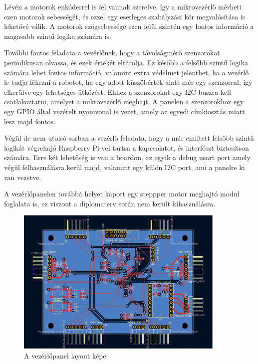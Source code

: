 Lévén a motorok enkóderrel is fel vannak szerelve, így a mikrovezérlő mérheti
ezen motorok sebességét, és ezzel egy esetleges szabályzási kör megvalósítása is
lehetővé válik. A motorok szögsebessége ezen felül szintén egy fontos információ
a magasabb szintű logika számára is.

További fontos feladata a vezérlőnek, hogy a távolságmérő szenzorokat
periodikusan olvassa, és ezek értékét eltárolja. Ez később a felsőbb szintű
logika számára lehet fontos információ, valamint extra védelmet jelenthet, ha a
vezérlő le tudja fékezni a robotot, ha egy adott küszöbérték alatt mér egy
szenzorral, így elkerülve egy lehetséges ütközést. Ehhez a szenzorokat egy I2C
buszra kell csatlakoztatni, amelyet a mikrovezérlő meghajt. A panelen a
szenzorokhoz egy egy GPIO által vezérelt nyomvonal is vezet, amely az egyedi
címkiosztás miatt lesz majd fontos.

Végül de nem utolsó sorban a vezérlő feladata, hogy a már említett felsőbb szintű
logikát végrehajó Raspberry Pi-vel tartsa a kapcsolatot, és interfészt
biztosítson számára. Erre két lehetőség is van a boardon, az egyik a debug usart
port amely végül felhasználásra kerül majd, valamint egy külön I2C port, ami a
panelre ki van vezetve.

A vezérlőpanelen továbbá helyet kapott egy steppper motor meghajtó modul
foglalata is, ez viszont a diplomaterv során nem került kihasználásra.

\begin{figure}
  \centering \includegraphics[width=100mm,
    keepaspectratio]{figures/ch1/movement-control-layout.png}
  \caption{A vezérlőpanel layout képe}
  \label{fig:crtl_layout}
\end{figure}

